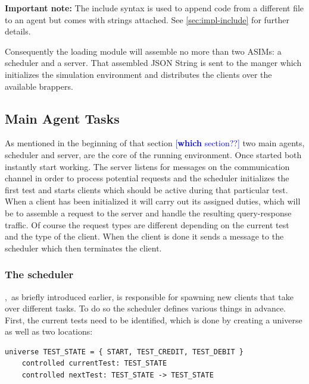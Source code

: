 \textbf{Important note:} The include syntax is used to append code from a different file to an agent but comes with strings attached. See \ref{sec:impl-include} for further details.

Consequently the loading module will assemble no more than two ASIMs: a scheduler and a server. That assembled JSON String is sent to the manger which initializes the simulation environment and distributes the clients over the available brappers.

\subsection{Main Agent Tasks}
\label{subsec:impl-agent-tasks}

As mentioned in the beginning of that section \textcolor{blue}{[{\bf which} section??]} two main agents, scheduler and server, are the core of the running environment. Once started both instantly start working. The server listens for messages on the communication channel in order to process potential requests and the scheduler initializes the first test and starts clients which should be active during that particular test. When a client has been initialized it will carry out its assigned duties, which will be to assemble a request to the server and handle the resulting query-response traffic. Of course the request types are different depending on the current test and the type of the client. When the client is done it sends a message to the scheduler which then terminates the client.

\subsubsection{The scheduler},\ as briefly introduced earlier, is responsible for spawning new clients that take over different tasks. To do so the scheduler defines various things in advance. First, the current tests need to be identified, which is done by creating a universe as well as two locations:

\begin{lstlisting}[language=bsl]
	universe TEST_STATE = { START, TEST_CREDIT, TEST_DEBIT }
	controlled currentTest: TEST_STATE
	controlled nextTest: TEST_STATE -> TEST_STATE
\end{lstlisting}

